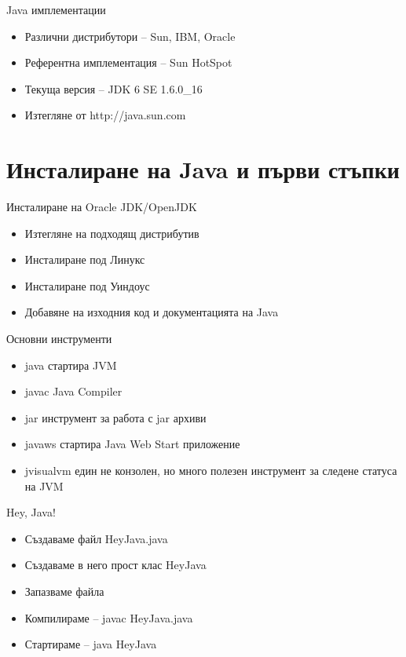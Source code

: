 \documentclass{beamer}
\begin{document}
\begin{frame}{Java имплементации}
  \begin{itemize}
  \item Различни дистрибутори – Sun, IBM,
  Oracle

  \item Референтна имплементация – Sun
  HotSpot

  \item Текуща версия – JDK 6 SE 1.6.0\_16
  \item Изтегляне от http://java.sun.com
  \end{itemize}
\end{frame}

\section{Инсталиране на Java и първи стъпки}


\begin{frame}{Инсталиране на Oracle JDK/OpenJDK}
  
  \begin{itemize}
    \item Изтегляне на подходящ дистрибутив
    \item Инсталиране под Линукс
    \item Инсталиране под Уиндоус
    \item Добавяне на изходния код и
      документацията на Java
  \end{itemize}

\end{frame}


\begin{frame}{Основни инструменти}
  
  \begin{itemize}
    \item java стартира JVM
    \item javac Java Compiler
    \item jar инструмент за работа с jar архиви
    \item javaws стартира Java Web Start
    приложение
    \item jvisualvm един не конзолен, но много
    полезен инструмент за следене статуса
    на JVM
  \end{itemize}

\end{frame}


\begin{frame}{Hey, Java!}
  
  \begin{itemize}
    \item Създаваме файл HeyJava.java
    \item Създаваме в него прост клас HeyJava
    \item Запазваме файла
    \item Компилираме – javac HeyJava.java
    \item Стартираме – java HeyJava
  \end{itemize}

\end{frame}
\end{document}

